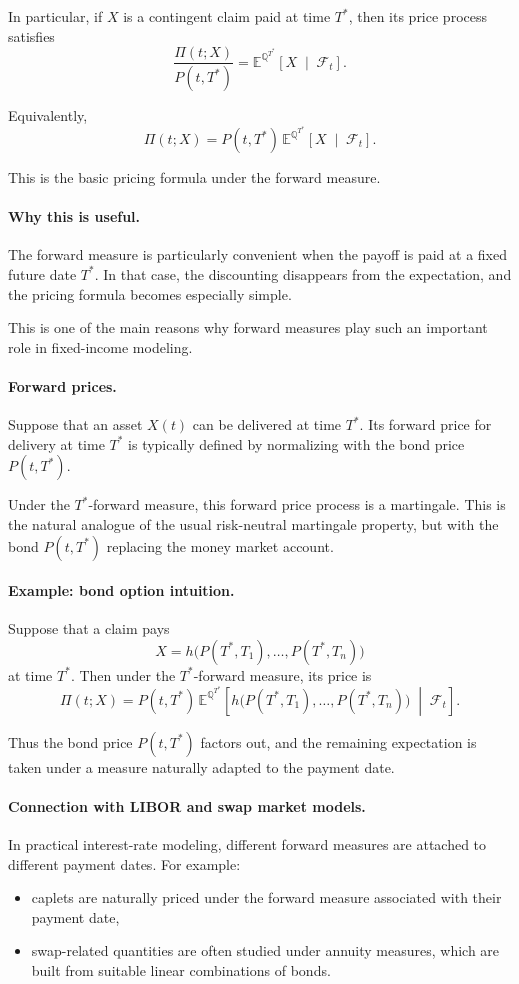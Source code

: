 \documentclass[11pt]{article}
\newcommand{\Qbb}{\mathbb{Q}}
\newcommand{\E}{\mathbb{E}}
\theoremstyle{definition}
\theoremstyle{plain}
\begin{document}
In particular, if \(X\) is a contingent claim paid at time \(T^\ast\),
then its price process satisfies
\[
\frac{\Pi(t;X)}{P(t,T^\ast)}
=
\E^{\Qbb^{T^\ast}}\!\left[
X
\;\middle|\;
\mathcal{F}_t
\right].
\]

Equivalently,
\[
\boxed{
\Pi(t;X)
=
P(t,T^\ast)\,
\E^{\Qbb^{T^\ast}}\!\left[
X
\;\middle|\;
\mathcal{F}_t
\right].
}
\]

This is the basic pricing formula under the forward measure.

\paragraph{Why this is useful.}
The forward measure is particularly convenient when the payoff is paid at
a fixed future date \(T^\ast\).
In that case, the discounting disappears from the expectation, and the
pricing formula becomes especially simple.

This is one of the main reasons why forward measures play such an
important role in fixed-income modeling.

\paragraph{Forward prices.}
Suppose that an asset \(X(t)\) can be delivered at time \(T^\ast\).
Its forward price for delivery at time \(T^\ast\) is typically defined by
normalizing with the bond price \(P(t,T^\ast)\).

Under the \(T^\ast\)-forward measure, this forward price process is a
martingale.
This is the natural analogue of the usual risk-neutral martingale
property, but with the bond \(P(t,T^\ast)\) replacing the money market
account.

\paragraph{Example: bond option intuition.}
Suppose that a claim pays
\[
X = h\big(P(T^\ast,T_1),\dots,P(T^\ast,T_n)\big)
\]
at time \(T^\ast\).
Then under the \(T^\ast\)-forward measure, its price is
\[
\Pi(t;X)
=
P(t,T^\ast)\,
\E^{\Qbb^{T^\ast}}\!\left[
h\big(P(T^\ast,T_1),\dots,P(T^\ast,T_n)\big)
\;\middle|\;
\mathcal{F}_t
\right].
\]

Thus the bond price \(P(t,T^\ast)\) factors out, and the remaining
expectation is taken under a measure naturally adapted to the payment
date.

\paragraph{Connection with LIBOR and swap market models.}
In practical interest-rate modeling, different forward measures are
attached to different payment dates.
For example:
\begin{itemize}[leftmargin=1.4em]
\item caplets are naturally priced under the forward measure associated
with their payment date,
\item swap-related quantities are often studied under annuity measures,
which are built from suitable linear combinations of bonds.
\end{itemize}
\end{document}
